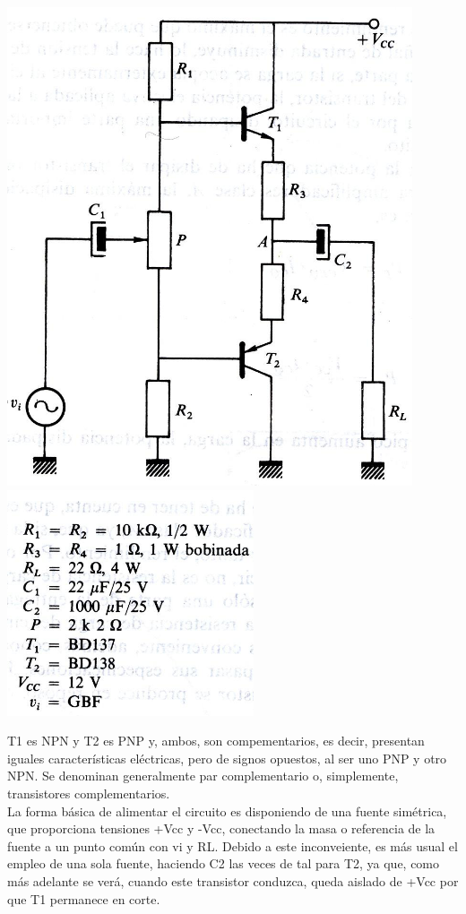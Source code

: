 \documentclass[10pt,a4paper]{article}
\begin{document}
\includegraphics[scale=.40]{b.png}\includegraphics[scale=.60]{bb.png}\\
\raggedright
T1 es NPN y T2 es PNP y, ambos, son compementarios, es decir, presentan iguales características eléctricas, pero de signos opuestos, al ser uno PNP y otro NPN. Se denominan generalmente par complementario o, simplemente, transistores complementarios.\\
La forma básica de alimentar el circuito es disponiendo de una fuente simétrica, que proporciona tensiones +Vcc y -Vcc, conectando la masa o referencia de la fuente a un punto común con vi y RL. Debido a este inconveiente, es más usual el empleo de una sola fuente, haciendo C2 las veces de tal para T2, ya que, como más adelante se verá, cuando este transistor conduzca, queda aislado de +Vcc por que T1 permanece en corte.\\
\end{document}
